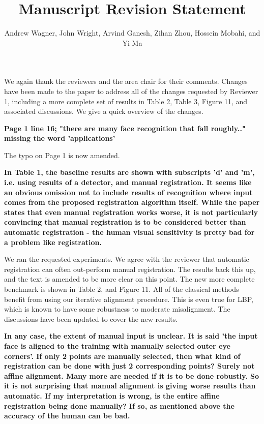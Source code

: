 \documentclass[11pt]{article}
\begin{document}
   

   \title{\Large {\bf Manuscript  Revision Statement}}

   \author{{Andrew Wagner, John Wright, Arvind Ganesh, Zihan Zhou, Hossein Mobahi, and Yi Ma}}

   \date{}
   \maketitle

\vspace{-.2in}
We again thank the reviewers and the area chair for their comments.
Changes have been made to the paper to address all of the changes requested by Reviewer 1,
including a more complete set of results in Table 2, Table 3, Figure 11, and associated
discussions.  We give a quick overview of the changes.

{\bf
	Page 1 line 16; "there are many face recognition that fall roughly.."
	missing the word 'applications'
}

The typo on Page 1 is now amended.

{\bf
	In Table 1, the baseline results are shown with subscripts 'd' and 'm', i.e.
	using results of a detector, and manual registration. It seems like an obvious
	omission not to include results of recognition where input comes from the
	proposed registration algorithm itself. While the paper states that even
	manual registration works worse, it is not particularly convincing that manual
	registration is to be considered better than automatic registration - the
	human visual sensitivity is pretty bad for a problem like registration.
}

We ran the requested experiments.  We agree with the reviewer that automatic registration
can often out-perform manual registration.  The results back this up, and the text
is amended to be more clear on this point.  The new more complete benchmark is shown in
Table 2, and Figure 11.  All of the classical methods benefit from using our iterative
alignment procedure.  This is even true for LBP, which is known to have some robustness
to moderate misalignment.  The discussions have been updated to cover the new results.

{\bf
	In any case, the extent of manual input is unclear. It is said 'the input face
	is aligned to the training with manually selected outer eye corners'. If only
	2 points are manually selected, then what kind of registration can be done
	with just 2 corresponding points? Surely not affine alignment. Many more are
	needed if it is to be done robustly. So it is not surprising that manual
	alignment is giving worse results than automatic. If my interpretation is
	wrong, is the entire affine registration being done manually? If so, as
	mentioned above the accuracy of the human can be bad.
}
\end{document}
